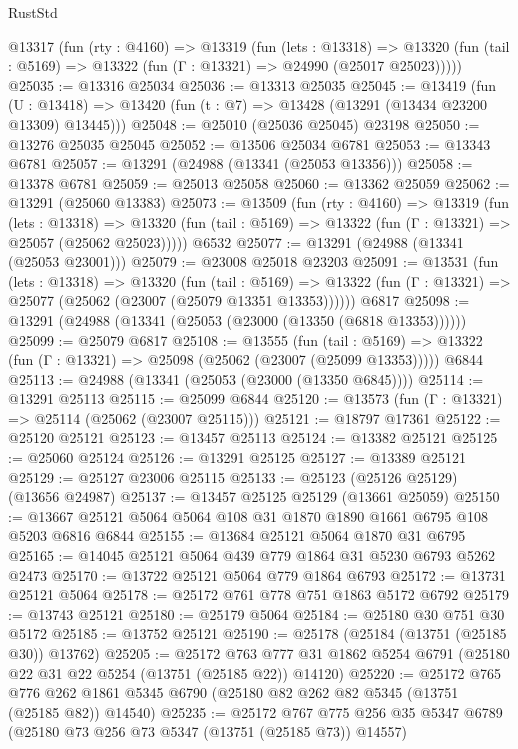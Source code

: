 \begin{lexlean}{RustStd}
\begin{coremodule}
  @13317
    (fun (rty : @4160) =>
    @13319
      (fun (lets : @13318) =>
      @13320 (fun (tail : @5169) => @13322 (fun (Γ : @13321) => @24990 (@25017 @25023)))))
@25035 := @13316 @25034
@25036 := @13313 @25035
@25045 := @13419
    (fun (U : @13418) => @13420 (fun (t : @7) => @13428 (@13291 (@13434 @23200 @13309) @13445)))
@25048 := @25010 (@25036 @25045) @23198
@25050 := @13276 @25035 @25045
@25052 := @13506 @25034 @6781
@25053 := @13343 @6781
@25057 := @13291 (@24988 (@13341 (@25053 @13356)))
@25058 := @13378 @6781
@25059 := @25013 @25058
@25060 := @13362 @25059
@25062 := @13291 (@25060 @13383)
@25073 := @13509
    (fun (rty : @4160) =>
    @13319
      (fun (lets : @13318) =>
      @13320 (fun (tail : @5169) => @13322 (fun (Γ : @13321) => @25057 (@25062 @25023)))))
    @6532
@25077 := @13291 (@24988 (@13341 (@25053 @23001)))
@25079 := @23008 @25018 @23203
@25091 := @13531
    (fun (lets : @13318) =>
    @13320
      (fun (tail : @5169) =>
      @13322 (fun (Γ : @13321) => @25077 (@25062 (@23007 (@25079 @13351 @13353))))))
    @6817
@25098 := @13291 (@24988 (@13341 (@25053 (@23000 (@13350 (@6818 @13353))))))
@25099 := @25079 @6817
@25108 := @13555
    (fun (tail : @5169) => @13322 (fun (Γ : @13321) => @25098 (@25062 (@23007 (@25099 @13353)))))
    @6844
@25113 := @24988 (@13341 (@25053 (@23000 (@13350 @6845))))
@25114 := @13291 @25113
@25115 := @25099 @6844
@25120 := @13573 (fun (Γ : @13321) => @25114 (@25062 (@23007 @25115)))
@25121 := @18797 @17361
@25122 := @25120 @25121
@25123 := @13457 @25113
@25124 := @13382 @25121
@25125 := @25060 @25124
@25126 := @13291 @25125
@25127 := @13389 @25121
@25129 := @25127 @23006 @25115
@25133 := @25123 (@25126 @25129) (@13656 @24987)
@25137 := @13457 @25125 @25129 (@13661 @25059)
@25150 := @13667 @25121 @5064 @5064 @108 @31 @1870 @1890 @1661 @6795 @108 @5203 @6816 @6844
@25155 := @13684 @25121 @5064 @1870 @31 @6795
@25165 := @14045 @25121 @5064 @439 @779 @1864 @31 @5230 @6793 @5262 @2473
@25170 := @13722 @25121 @5064 @779 @1864 @6793
@25172 := @13731 @25121 @5064
@25178 := @25172 @761 @778 @751 @1863 @5172 @6792
@25179 := @13743 @25121
@25180 := @25179 @5064
@25184 := @25180 @30 @751 @30 @5172
@25185 := @13752 @25121
@25190 := @25178 (@25184 (@13751 (@25185 @30)) @13762)
@25205 := @25172
    @763
    @777
    @31
    @1862
    @5254
    @6791
    (@25180 @22 @31 @22 @5254 (@13751 (@25185 @22)) @14120)
@25220 := @25172
    @765
    @776
    @262
    @1861
    @5345
    @6790
    (@25180 @82 @262 @82 @5345 (@13751 (@25185 @82)) @14540)
@25235 := @25172
    @767
    @775
    @256
    @35
    @5347
    @6789
    (@25180 @73 @256 @73 @5347 (@13751 (@25185 @73)) @14557)

\end{coremodule}
\end{lexlean}
